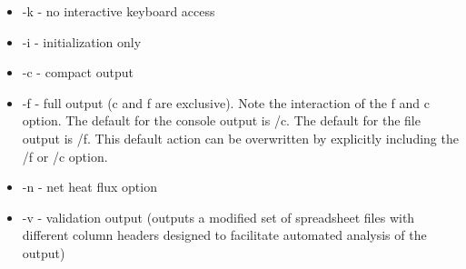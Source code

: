 \begin{itemize}
\item -k - no interactive keyboard access
\item -i - initialization only
\item -c - compact output
\item -f - full output (c and f are exclusive). Note the interaction of the f and c option. The default for the console output is /c. The default for the file output is /f. This default action can be overwritten by explicitly including the /f or /c option.
\item -n - net heat flux option
\item -v - validation output (outputs a modified set of spreadsheet files with different column headers designed to facilitate automated analysis of the output)
\end{itemize}


\label{last_page}

